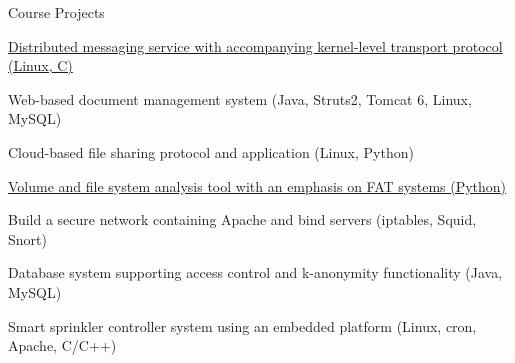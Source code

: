 \documentclass{resume} %
\begin{document}
\begin{rSection}{Course Projects}

\begin{asparaitem} \itemsep1pt \parskip0pt 
	\item \href{https://bitbucket.org/jpaglier/cse536-kernel-dev}{Distributed messaging service with accompanying kernel-level transport protocol \hfill (Linux, C)}
	\item Web-based document management system \hfill (Java, Struts2, Tomcat 6, Linux, MySQL)
	\item Cloud-based file sharing protocol and application \hfill (Linux, Python)
	\item \href{https://bitbucket.org/jpaglier/2012-spring-cse494-598_g-project}{Volume and file system analysis tool with an emphasis on FAT systems \hfill (Python)}
	\item Build a secure network containing Apache and bind servers \hfill (iptables, Squid, Snort)
	\item Database system supporting access control and k-anonymity functionality \hfill (Java, MySQL)
	\item Smart sprinkler controller system using an embedded platform \hfill (Linux, cron, Apache, C/C++)
\end{asparaitem}

\end{rSection}


\end{document}
